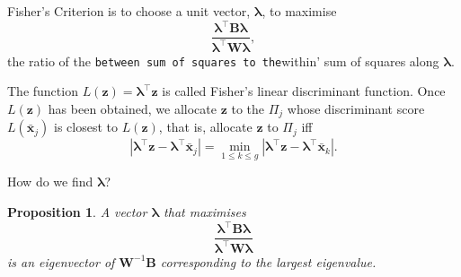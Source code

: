 \documentclass[]{book}
\newtheorem{proposition}{Proposition}[chapter]
\theoremstyle{definition}
\theoremstyle{definition}
\theoremstyle{definition}
\theoremstyle{remark}
\begin{document}
Fisher's Criterion is to choose a unit vector, \(\boldsymbol \lambda\), to maximise
\[ \frac{\boldsymbol \lambda^\top \boldsymbol B\boldsymbol \lambda}{\boldsymbol \lambda^\top \boldsymbol W\boldsymbol \lambda}, \]
the ratio of the \texttt{between\textquotesingle{}\ sum\ of\ squares\ to\ the}within' sum of squares along \(\boldsymbol \lambda\).

The function \(L(\boldsymbol z)=\boldsymbol \lambda^\top \boldsymbol z\) is called Fisher's linear discriminant function. Once \(L(\boldsymbol z)\) has been obtained, we allocate \(\boldsymbol z\) to the \(\Pi_j\) whose discriminant score \(L(\bar{\boldsymbol x}_j)\) is closest to \(L(\boldsymbol z)\), that is, allocate \(\boldsymbol z\) to \(\Pi_j\) iff
\[ | \boldsymbol \lambda^\top \boldsymbol z- \boldsymbol \lambda^\top \bar{\boldsymbol x}_j | = \min\limits_{1 \leq k \leq g} | \boldsymbol \lambda^\top \boldsymbol z- \boldsymbol \lambda^\top \bar{\boldsymbol x}_k |. \]

How do we find \(\boldsymbol \lambda\)?

\begin{proposition}
\protect\hypertarget{prp:nine2}{}{\label{prp:nine2} }A vector \(\boldsymbol \lambda\) that maximises \[\frac{\boldsymbol \lambda^\top \boldsymbol B\boldsymbol \lambda}{\boldsymbol \lambda^\top \boldsymbol W\boldsymbol \lambda}\] is an eigenvector of \(\boldsymbol W^{-1}\boldsymbol B\) corresponding to the largest eigenvalue.
\end{proposition}
\end{document}
